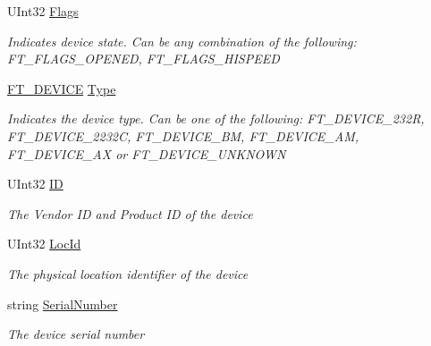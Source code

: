 \begin{DoxyCompactItemize}
\item 
U\+Int32 \mbox{\hyperlink{class_f_t_d2_x_x___n_e_t_1_1_f_t_d_i_1_1_f_t___d_e_v_i_c_e___i_n_f_o___n_o_d_e_a5110e6afb8dba49a7d9cd7ece0637f0b}{Flags}}
\begin{DoxyCompactList}\small\item\em Indicates device state. Can be any combination of the following\+: F\+T\+\_\+\+F\+L\+A\+G\+S\+\_\+\+O\+P\+E\+N\+ED, F\+T\+\_\+\+F\+L\+A\+G\+S\+\_\+\+H\+I\+S\+P\+E\+ED \end{DoxyCompactList}\item 
\mbox{\hyperlink{class_f_t_d2_x_x___n_e_t_1_1_f_t_d_i_a7f69db13362f65d251d6b16e3eec585f}{F\+T\+\_\+\+D\+E\+V\+I\+CE}} \mbox{\hyperlink{class_f_t_d2_x_x___n_e_t_1_1_f_t_d_i_1_1_f_t___d_e_v_i_c_e___i_n_f_o___n_o_d_e_ae0765017b670d18263d724cc2facc99f}{Type}}
\begin{DoxyCompactList}\small\item\em Indicates the device type. Can be one of the following\+: F\+T\+\_\+\+D\+E\+V\+I\+C\+E\+\_\+232R, F\+T\+\_\+\+D\+E\+V\+I\+C\+E\+\_\+2232C, F\+T\+\_\+\+D\+E\+V\+I\+C\+E\+\_\+\+BM, F\+T\+\_\+\+D\+E\+V\+I\+C\+E\+\_\+\+AM, F\+T\+\_\+\+D\+E\+V\+I\+C\+E\+\_\+AX or F\+T\+\_\+\+D\+E\+V\+I\+C\+E\+\_\+\+U\+N\+K\+N\+O\+WN \end{DoxyCompactList}\item 
U\+Int32 \mbox{\hyperlink{class_f_t_d2_x_x___n_e_t_1_1_f_t_d_i_1_1_f_t___d_e_v_i_c_e___i_n_f_o___n_o_d_e_acb35b66a7778dd0a8ef437620c51fbc6}{ID}}
\begin{DoxyCompactList}\small\item\em The Vendor ID and Product ID of the device \end{DoxyCompactList}\item 
U\+Int32 \mbox{\hyperlink{class_f_t_d2_x_x___n_e_t_1_1_f_t_d_i_1_1_f_t___d_e_v_i_c_e___i_n_f_o___n_o_d_e_a9184dec4d947c80d44927c8abb309de1}{Loc\+Id}}
\begin{DoxyCompactList}\small\item\em The physical location identifier of the device \end{DoxyCompactList}\item 
string \mbox{\hyperlink{class_f_t_d2_x_x___n_e_t_1_1_f_t_d_i_1_1_f_t___d_e_v_i_c_e___i_n_f_o___n_o_d_e_addd6c1d3ea5477d63a2f61f3164bb975}{Serial\+Number}}
\begin{DoxyCompactList}\small\item\em The device serial number \end{DoxyCompactList}\item 

\end{DoxyCompactItemize}
